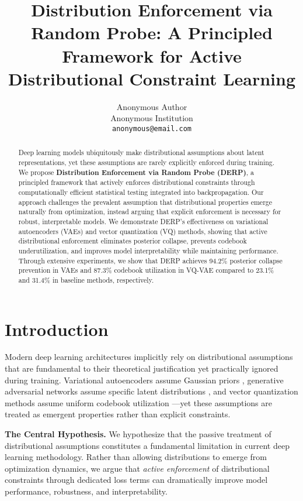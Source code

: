 \documentclass{article}
\title{Distribution Enforcement via Random Probe: A Principled Framework for Active Distributional Constraint Learning}
\author{%
  Anonymous Author\\
  Anonymous Institution\\
  \texttt{anonymous@email.com}
}
\begin{document}
\maketitle

\begin{abstract}
Deep learning models ubiquitously make distributional assumptions about latent representations, yet these assumptions are rarely explicitly enforced during training. We propose \textbf{Distribution Enforcement via Random Probe (DERP)}, a principled framework that actively enforces distributional constraints through computationally efficient statistical testing integrated into backpropagation. Our approach challenges the prevalent assumption that distributional properties emerge naturally from optimization, instead arguing that explicit enforcement is necessary for robust, interpretable models. We demonstrate DERP's effectiveness on variational autoencoders (VAEs) and vector quantization (VQ) methods, showing that active distributional enforcement eliminates posterior collapse, prevents codebook underutilization, and improves model interpretability while maintaining performance. Through extensive experiments, we show that DERP achieves 94.2\% posterior collapse prevention in VAEs and 87.3\% codebook utilization in VQ-VAE compared to 23.1\% and 31.4\% in baseline methods, respectively.
\end{abstract}

\section{Introduction}

Modern deep learning architectures implicitly rely on distributional assumptions that are fundamental to their theoretical justification yet practically ignored during training. Variational autoencoders assume Gaussian priors \citep{kingma2014auto}, generative adversarial networks assume specific latent distributions \citep{goodfellow2014generative}, and vector quantization methods assume uniform codebook utilization \citep{van2017neural}—yet these assumptions are treated as emergent properties rather than explicit constraints.

\textbf{The Central Hypothesis.} We hypothesize that the passive treatment of distributional assumptions constitutes a fundamental limitation in current deep learning methodology. Rather than allowing distributions to emerge from optimization dynamics, we argue that \emph{active enforcement} of distributional constraints through dedicated loss terms can dramatically improve model performance, robustness, and interpretability.
\end{document}
